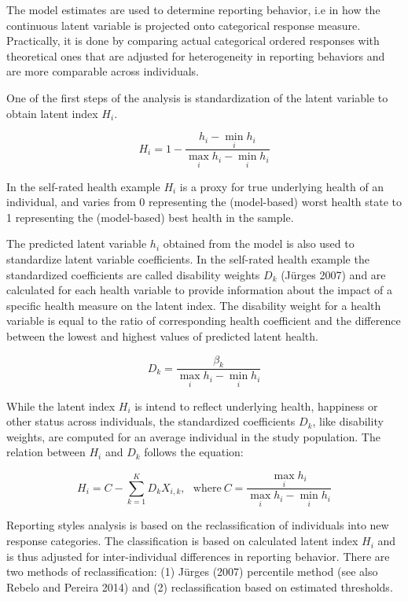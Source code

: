 \documentclass[]{article}
\begin{document}
The model estimates are used to determine reporting behavior, i.e in how
the continuous latent variable is projected onto categorical response
measure. Practically, it is done by comparing actual categorical ordered
responses with theoretical ones that are adjusted for heterogeneity in
reporting behaviors and are more comparable across individuals.

One of the first steps of the analysis is standardization of the latent
variable to obtain latent index \(H_i\).

\begin{equation}
\label{eq:8}
H_i = 1-\frac{h_i-\displaystyle\min_i h_i}{\displaystyle\max_i h_i-\displaystyle\min_i h_i}
\end{equation}

In the self-rated health example \(H_i\) is a proxy for true underlying
health of an individual, and varies from 0 representing the
(model-based) worst health state to 1 representing the (model-based)
best health in the sample.

The predicted latent variable \(h_i\) obtained from the model is also
used to standardize latent variable coefficients. In the self-rated
health example the standardized coefficients are called disability
weights \(D_k\) (Jürges 2007) and are calculated for each health
variable to provide information about the impact of a specific health
measure on the latent index. The disability weight for a health variable
is equal to the ratio of corresponding health coefficient and the
difference between the lowest and highest values of predicted latent
health.

\begin{equation}
\label{eq:9}
D_k= \frac{\beta_k}{\displaystyle\max_i h_i-\displaystyle\min_i h_i}
\end{equation}

While the latent index \(H_i\) is intend to reflect underlying health,
happiness or other status across individuals, the standardized
coefficients \(D_k\), like disability weights, are computed for an
average individual in the study population. The relation between \(H_i\)
and \(D_k\) follows the equation:

\begin{equation}
\label{eq:10}
H_i = C-\sum_{k=1}^K D_kX_{i,k}, ~~~\text{where}~C=\frac{\displaystyle\max_i h_i}{\displaystyle\max_i h_i-\displaystyle\min_i h_i}
\end{equation}

Reporting styles analysis is based on the reclassification of
individuals into new response categories. The classification is based on
calculated latent index \(H_i\) and is thus adjusted for
inter-individual differences in reporting behavior. There are two
methods of reclassification: (1) Jürges (2007) percentile method (see
also Rebelo and Pereira 2014) and (2) reclassification based on
estimated thresholds.
\end{document}
